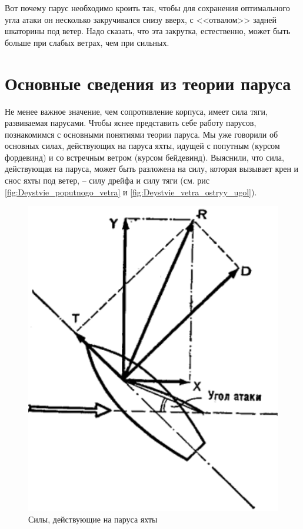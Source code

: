 \documentclass[a4paper, 12pt, twoside, final]{scrbook}
\begin{document}
Вот почему парус необходимо кроить так, чтобы для сохранения оптимального угла атаки он несколько закручивался снизу вверх, с <<отвалом>> задней шкаторины под ветер. Надо сказать, что эта закрутка, естественно, может быть больше при слабых ветрах, чем при сильных.

\section{Основные сведения из теории паруса}

Не менее важное значение, чем сопротивление корпуса, имеет сила тяги, развиваемая парусами. Чтобы яснее представить себе работу парусов, познакомимся с основными понятиями теории паруса.
Мы уже говорили об основных силах, действующих на паруса яхты, идущей с попутным (курсом фордевинд) и со встречным ветром (курсом бейдевинд). Выяснили, что сила, действующая на паруса, может быть разложена на силу, которая вызывает крен и снос яхты под ветер, \--- силу дрейфа и силу тяги (см. рис \ref{fig:Deystvie_poputnogo_vetra} и \ref{fig:Deystvie_vetra_ostryy_ugol}).

\begin{figure}
	\centering
	\includegraphics[scale=1]{94_Sily_dejstv_na_parusa_yakhty}
	\caption{Силы, действующие на паруса яхты}
	\label{fig:94}
\end{figure}
\end{document}
